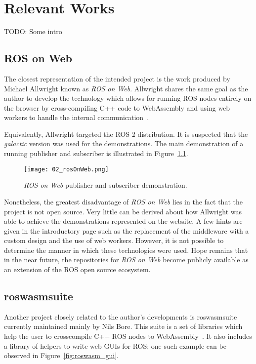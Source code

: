 \chapter{Relevant Works}

    TODO: Some intro


    \section{ROS on Web}

        The closest representation of the intended project is the work produced by Michael Allwright known as \textit{ROS on Web}. Allwright shares the same goal as the author to develop the technology which allows for running ROS nodes entirely on the browser by cross-compiling C++ code to WebAssembly and using web workers to handle the internal communication~\cite{rosonweb}.

        Equivalently, Allwright targeted the \ac{ROS} 2 distribution. It is suspected that the \textit{galactic} version was used for the demonstrations. The main demonstration of a running publisher and subscriber is illustrated in Figure~\ref{fig:rosonweb}.
        
        
        \begin{figure}[htbp]
            \centering
            \texttt{[image: 02\_rosOnWeb.png]}
            \caption{\textit{ROS on Web} publisher and subscriber demonstration.}
            \label{fig:rosonweb}
        \end{figure}

        Nonetheless, the greatest disadvantage of \textit{ROS on Web} lies in the fact that the project is not open source. Very little can be derived about how Allwright was able to achieve the demonstrations represented on the website. A few hints are given in the introductory page such as the replacement of the middleware with a custom design and the use of web workers. However, it is not possible to determine the manner in which these technologies were used. Hope remains that in the near future, the repositories for \textit{ROS on Web} become publicly available as an extension of the ROS open source ecosystem.

    \section{roswasm\smallunderscore suite}

        Another project closely related to the author's developments is \textsf{roswasm\smallunderscore suite} currently maintained mainly by Nils Bore. This suite is a set of libraries which help the user to cross\-compile C++ ROS nodes to WebAssembly~\cite{roswasmsuite}. It also includes a library of helpers to write web \ac{GUI}s for ROS; one such example can be observed in Figure~\ref{fig:roswasm_gui}.

